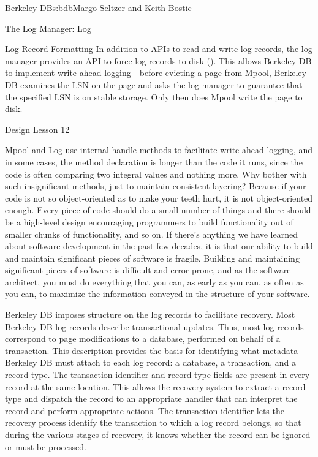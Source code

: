 \begin{aosachapter}{Berkeley DB}{s:bdb}{Margo Seltzer and Keith Bostic}
\begin{aosasect1}{The Log Manager: Log}
\begin{aosasect2}{Log Record Formatting}
In addition to APIs to read and write log records, the log manager
provides an API to force log records to disk
().  This allows Berkeley DB to
implement write-ahead logging---before evicting a page from Mpool,
Berkeley DB examines the LSN on the page and asks the log manager to
guarantee that the specified LSN is on stable storage. Only then does
Mpool write the page to disk. 

\begin{aosabox}{Design Lesson 12}

Mpool and Log use internal handle methods to facilitate write-ahead
logging, and in some cases, the method declaration is longer than the
code it runs, since the code is often comparing two integral values
and nothing more. Why bother with such insignificant methods, just to
maintain consistent layering?  Because if your code is not so
object-oriented as to make your teeth hurt, it is not object-oriented
enough. Every piece of code should do a small number of things and
there should be a high-level design encouraging programmers to build
functionality out of smaller chunks of functionality, and so on. If
there's anything we have learned about software development in the
past few decades, it is that our ability to build and maintain
significant pieces of software is fragile. Building and maintaining
significant pieces of software is difficult and error-prone, and as
the software architect, you must do everything that you can, as early
as you can, as often as you can, to maximize the information conveyed
in the structure of your software.

\end{aosabox}

Berkeley DB imposes structure on the log records to facilitate
recovery.  Most Berkeley DB log records describe transactional
updates. Thus, most log records correspond to page modifications to a
database, performed on behalf of a transaction. This description
provides the basis for identifying what metadata Berkeley DB must
attach to each log record: a database, a transaction, and a record
type. The transaction identifier and record type fields are present in every
record at the same location.  This allows the recovery system to
extract a record type and dispatch the record to an appropriate
handler that can interpret the record and perform appropriate
actions. The transaction identifier lets the recovery process identify the
transaction to which a log record belongs, so that during the various
stages of recovery, it knows whether the record can be ignored or must
be processed.


\end{aosasect2}
\end{aosasect1}
\end{aosachapter}
